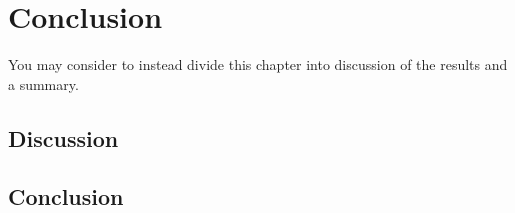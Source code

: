 \chapter{Conclusion}

You may consider to instead divide this chapter into discussion of the results and a summary. 

\section{Discussion}

\section{Conclusion}
